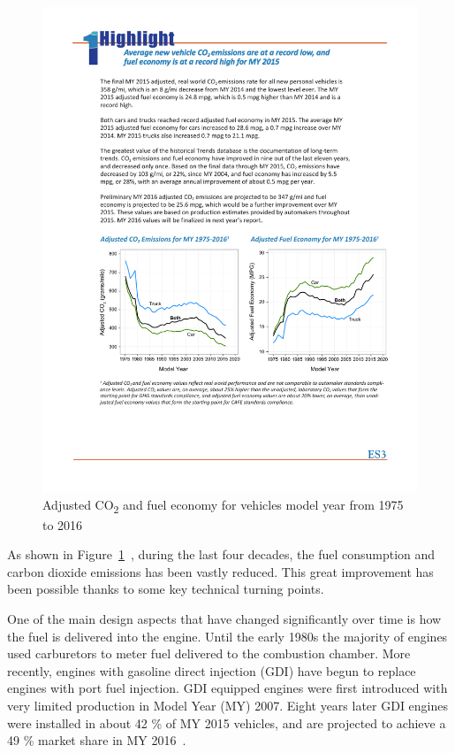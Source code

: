 \documentclass[12pt]{report}   %
\begin{document}
\begin{figure}[ht]
  \centering
  \includegraphics[width=\textwidth]{figures/review/adj_fuel_economy.pdf}
  \caption{Adjusted CO\textsubscript{2} and fuel economy for vehicles model year from 1975 to 2016\label{fig:adj_fuel_economy} }
\end{figure}

As shown in Figure~\ref{fig:adj_fuel_economy}~\cite{EPA2016}, during the last four decades, the fuel consumption and carbon dioxide emissions has been vastly reduced. This great improvement has been possible thanks to some key technical turning points.

One of the main design aspects that have changed significantly over time is how the fuel is delivered into the engine. Until the early 1980s the majority of engines used carburetors to meter fuel delivered to the combustion chamber. More recently, engines with gasoline direct injection (GDI) have begun to replace engines with port fuel injection. GDI equipped engines were first introduced with very limited production in Model Year (MY) 2007. Eight years later GDI engines were installed in about 42 \% of MY 2015 vehicles, and are projected to achieve a 49 \% market share in MY 2016~\cite{EPA2016}.
\end{document}
